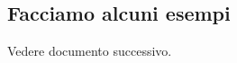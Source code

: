 \documentclass[11pt]{article}
\begin{document}
    \begin{center}
    \end{center}
    { \hspace*{\fill} \\}
    
    \subsection{Facciamo alcuni esempi}\label{facciamo-alcuni-esempi}

Vedere documento successivo.


    
    
    
    
\end{document}
